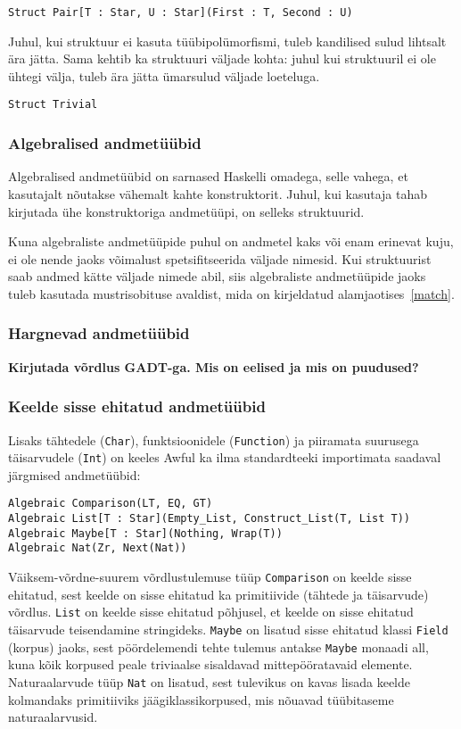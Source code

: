 \documentclass[12pt]{article}
\newcommand\markus[1]{\textcolor{roheline}{\textbf{#1}}}
\begin{document}
        \begin{verbatim}Struct Pair[T : Star, U : Star](First : T, Second : U)\end{verbatim}

        Juhul, kui struktuur ei kasuta tüübipolümorfismi, tuleb kandilised sulud lihtsalt ära jätta. Sama kehtib ka struktuuri väljade kohta: juhul kui struktuuril ei ole ühtegi välja, tuleb ära jätta ümarsulud väljade loeteluga.

        \begin{verbatim}Struct Trivial\end{verbatim}

      \subsubsection{Algebralised andmetüübid}
        Algebralised andmetüübid on sarnased Haskelli omadega, selle vahega, et kasutajalt nõutakse vähemalt kahte konstruktorit. Juhul, kui kasutaja tahab kirjutada ühe konstruktoriga andmetüüpi, on selleks struktuurid.

        Kuna algebraliste andmetüüpide puhul on andmetel kaks või enam erinevat kuju, ei ole nende jaoks võimalust spetsifitseerida väljade nimesid. Kui struktuurist saab andmed kätte väljade nimede abil, siis algebraliste andmetüüpide jaoks tuleb kasutada mustrisobituse avaldist, mida on kirjeldatud alamjaotises~\ref{match}.
      \subsubsection{Hargnevad andmetüübid}\label{hargnevad}
        \markus{Kirjutada võrdlus GADT-ga. Mis on eelised ja mis on puudused?}
      \subsubsection{Keelde sisse ehitatud andmetüübid}\label{sisseehitatudalgebralised}
        Lisaks tähtedele (\verb!Char!), funktsioonidele (\verb!Function!) ja piiramata suurusega täisarvudele (\verb!Int!) on keeles Awful ka ilma standardteeki importimata saadaval järgmised andmetüübid:

        \begin{verbatim}Algebraic Comparison(LT, EQ, GT)
Algebraic List[T : Star](Empty_List, Construct_List(T, List T))
Algebraic Maybe[T : Star](Nothing, Wrap(T))
Algebraic Nat(Zr, Next(Nat))\end{verbatim}

        Väiksem-võrdne-suurem võrdlustulemuse tüüp \verb!Comparison! on keelde sisse ehitatud, sest keelde on sisse ehitatud ka primitiivide (tähtede ja täisarvude) võrdlus. \verb!List! on keelde sisse ehitatud põhjusel, et keelde on sisse ehitatud täisarvude teisendamine stringideks. \verb!Maybe! on lisatud sisse ehitatud klassi \verb!Field! (korpus) jaoks, sest pöördelemendi tehte tulemus antakse \verb!Maybe! monaadi all, kuna kõik korpused peale triviaalse sisaldavad mittepööratavaid elemente. Naturaalarvude tüüp \verb!Nat! on lisatud, sest tulevikus on kavas lisada keelde kolmandaks primitiiviks jäägiklassikorpused, mis nõuavad tüübitaseme naturaalarvusid.
\end{document}
